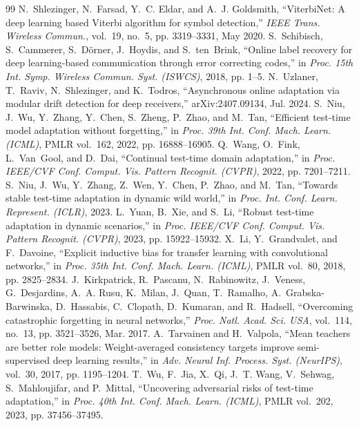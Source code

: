 \documentclass[journal]{IEEEtran}
\theoremstyle{remark}
\begin{document}
\begin{thebibliography}{99}
 N.~Shlezinger, N.~Farsad, Y.~C. Eldar, and A.~J. Goldsmith, ``ViterbiNet: A deep learning based Viterbi algorithm for symbol detection,'' \emph{IEEE Trans. Wireless Commun.}, vol.~19, no.~5, pp. 3319--3331, May 2020.
 S.~Schibisch, S.~Cammerer, S.~D{\"o}rner, J.~Hoydis, and S.~ten~Brink, ``Online label recovery for deep learning-based communication through error correcting codes,'' in \emph{Proc. 15th Int. Symp. Wireless Commun. Syst. (ISWCS)}, 2018, pp. 1--5.
 N.~Uzlaner, T.~Raviv, N.~Shlezinger, and K.~Todros, ``Asynchronous online adaptation via modular drift detection for deep receivers,'' arXiv:2407.09134, Jul. 2024.
 S.~Niu, J.~Wu, Y.~Zhang, Y.~Chen, S.~Zheng, P.~Zhao, and M.~Tan, ``Efficient test-time model adaptation without forgetting,'' in \emph{Proc. 39th Int. Conf. Mach. Learn. (ICML)}, PMLR vol.~162, 2022, pp. 16888--16905.
 Q.~Wang, O.~Fink, L.~Van~Gool, and D.~Dai, ``Continual test-time domain adaptation,'' in \emph{Proc. IEEE/CVF Conf. Comput. Vis. Pattern Recognit. (CVPR)}, 2022, pp. 7201--7211.
 S.~Niu, J.~Wu, Y.~Zhang, Z.~Wen, Y.~Chen, P.~Zhao, and M.~Tan, ``Towards stable test-time adaptation in dynamic wild world,'' in \emph{Proc. Int. Conf. Learn. Represent. (ICLR)}, 2023.
 L.~Yuan, B.~Xie, and S.~Li, ``Robust test-time adaptation in dynamic scenarios,'' in \emph{Proc. IEEE/CVF Conf. Comput. Vis. Pattern Recognit. (CVPR)}, 2023, pp. 15922--15932.
 X.~Li, Y.~Grandvalet, and F.~Davoine, ``Explicit inductive bias for transfer learning with convolutional networks,'' in \emph{Proc. 35th Int. Conf. Mach. Learn. (ICML)}, PMLR vol.~80, 2018, pp. 2825--2834.
 J.~Kirkpatrick, R.~Pascanu, N.~Rabinowitz, J.~Veness, G.~Desjardins, A.~A. Rusu, K.~Milan, J.~Quan, T.~Ramalho, A.~Grabska-Barwinska, D.~Hassabis, C.~Clopath, D.~Kumaran, and R.~Hadsell, ``Overcoming catastrophic forgetting in neural networks,'' \emph{Proc. Natl. Acad. Sci. USA}, vol.~114, no.~13, pp. 3521--3526, Mar. 2017.
 A.~Tarvainen and H.~Valpola, ``Mean teachers are better role models: Weight-averaged consistency targets improve semi-supervised deep learning results,'' in \emph{Adv. Neural Inf. Process. Syst. (NeurIPS)}, vol.~30, 2017, pp. 1195--1204.
 T.~Wu, F.~Jia, X.~Qi, J.~T. Wang, V.~Sehwag, S.~Mahloujifar, and P.~Mittal, ``Uncovering adversarial risks of test-time adaptation,'' in \emph{Proc. 40th Int. Conf. Mach. Learn. (ICML)}, PMLR vol.~202, 2023, pp. 37456--37495.

\end{thebibliography}
\end{document}
